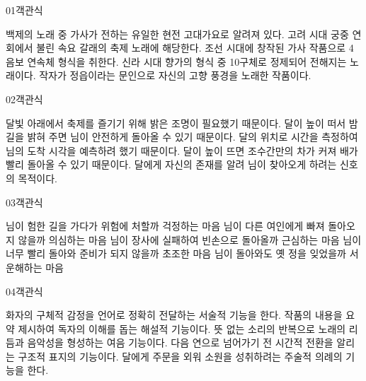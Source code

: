 \documentclass[fs85,seriesWit]{korfarm-base}
\begin{document}
\kfBeginMC
\begin{kfQBlock}{01}{객관식}
\begin{kfChoices}
\kfChoice 백제의 노래 중 가사가 전하는 유일한 현전 고대가요로 알려져 있다.
\kfChoice 고려 시대 궁중 연회에서 불린 속요 갈래의 축제 노래에 해당한다.
\kfChoice 조선 시대에 창작된 가사 작품으로 4음보 연속체 형식을 취한다.
\kfChoice 신라 시대 향가의 형식 중 10구체로 정제되어 전해지는 노래이다.
\kfChoice 작자가 정읍이라는 문인으로 자신의 고향 풍경을 노래한 작품이다.
\end{kfChoices}
\end{kfQBlock}

\begin{kfQBlock}{02}{객관식}
\begin{kfChoices}
\kfChoice 달빛 아래에서 축제를 즐기기 위해 밝은 조명이 필요했기 때문이다.
\kfChoice 달이 높이 떠서 밤길을 밝혀 주면 님이 안전하게 돌아올 수 있기 때문이다.
\kfChoice 달의 위치로 시간을 측정하여 님의 도착 시각을 예측하려 했기 때문이다.
\kfChoice 달이 높이 뜨면 조수간만의 차가 커져 배가 빨리 돌아올 수 있기 때문이다.
\kfChoice 달에게 자신의 존재를 알려 님이 찾아오게 하려는 신호의 목적이다.
\end{kfChoices}
\end{kfQBlock}

\begin{kfQBlock}{03}{객관식}
\begin{kfChoices}
\kfChoice 님이 험한 길을 가다가 위험에 처할까 걱정하는 마음
\kfChoice 님이 다른 여인에게 빠져 돌아오지 않을까 의심하는 마음
\kfChoice 님이 장사에 실패하여 빈손으로 돌아올까 근심하는 마음
\kfChoice 님이 너무 빨리 돌아와 준비가 되지 않을까 초조한 마음
\kfChoice 님이 돌아와도 옛 정을 잊었을까 서운해하는 마음
\end{kfChoices}
\end{kfQBlock}

\begin{kfQBlock}{04}{객관식}
\begin{kfChoices}
\kfChoice 화자의 구체적 감정을 언어로 정확히 전달하는 서술적 기능을 한다.
\kfChoice 작품의 내용을 요약 제시하여 독자의 이해를 돕는 해설적 기능이다.
\kfChoice 뜻 없는 소리의 반복으로 노래의 리듬과 음악성을 형성하는 여음 기능이다.
\kfChoice 다음 연으로 넘어가기 전 시간적 전환을 알리는 구조적 표지의 기능이다.
\kfChoice 달에게 주문을 외워 소원을 성취하려는 주술적 의례의 기능을 한다.
\end{kfChoices}
\end{kfQBlock}
\end{document}
